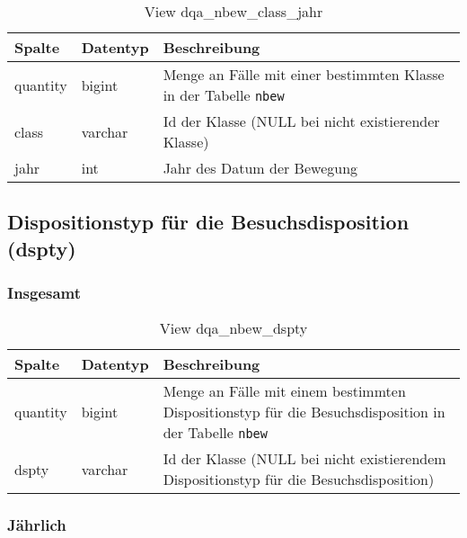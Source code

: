 \begin{table}[ht]
	\centering   
	\caption{View dqa\_nbew\_class\_jahr}
	\label{tab:bewClassJ}
	\begin{tabular}{||l|l|p{10cm}||}   		
		\hline
		Spalte & Datentyp & Beschreibung \\ [0.5ex]
		\hline\hline
		quantity & bigint & Menge an Fälle mit einer bestimmten Klasse in der Tabelle \texttt{nbew}\\
		\hline
		class & varchar & Id der Klasse (NULL bei nicht existierender Klasse)\\
		\hline
		jahr & int &  Jahr des Datum der Bewegung \\
		\hline		
	\end{tabular}
\end{table}

\newpage

\subsection{Dispositionstyp für die Besuchsdisposition (dspty)} \label{subsec:bewdspty}

\subsubsection{Insgesamt} \label{subsubsec:bewDsptyI}

\begin{table}[ht]
	\centering   
	\caption{View dqa\_nbew\_dspty}
	\label{tab:bewDsptyI}
	\begin{tabular}{||l|l|p{10cm}||}   		
		\hline
		Spalte & Datentyp & Beschreibung \\ [0.5ex]
		\hline\hline
		quantity & bigint & Menge an Fälle mit einem bestimmten Dispositionstyp für die Besuchsdisposition in der Tabelle \texttt{nbew} \\
		\hline
		dspty & varchar & Id der Klasse (NULL bei nicht existierendem Dispositionstyp für die Besuchsdisposition)\\
		\hline
		
	\end{tabular}
\end{table}

\subsubsection{Jährlich} \label{subsubsec:bewDsptyJ}

